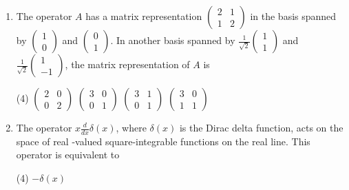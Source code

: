 \begin{enumerate}
 \begin{tasks}(2)
	\task[\textbf{a.}]Saturates to a finite value
	\task[\textbf{b.}]Increases with time as $\sqrt{t}$
	\task[\textbf{c.}]Increases linearly with time
	\task[\textbf{d.}]Increases exponentially with time
\end{tasks}
\item The operator $A$ has a matrix representation $\left(\begin{array}{ll}2 & 1 \\ 1 & 2\end{array}\right)$ in the basis spanned by $\left(\begin{array}{l}1 \\ 0\end{array}\right)$ and $\left(\begin{array}{l}0 \\ 1\end{array}\right)$. In another basis spanned by $\frac{1}{\sqrt{2}}\left(\begin{array}{l}1 \\ 1\end{array}\right)$ and $\frac{1}{\sqrt{2}}\left(\begin{array}{c}1 \\ -1\end{array}\right)$, the matrix representation of $A$ is
 \begin{tasks}(4)
	\task[\textbf{a.}]$\left(\begin{array}{ll}2 & 0 \\ 0 & 2\end{array}\right)$
	\task[\textbf{b.}]$\left(\begin{array}{ll}3 & 0 \\ 0 & 1\end{array}\right)$
	\task[\textbf{c.}]$\left(\begin{array}{ll}3 & 1 \\ 0 & 1\end{array}\right)$
	\task[\textbf{d.}] $\left(\begin{array}{ll}3 & 0 \\ 1 & 1\end{array}\right)$
\end{tasks}
\item The operator $x \frac{d}{d x} \delta(x)$, where $\delta(x)$ is the Dirac delta function, acts on the space of real -valued square-integrable functions on the real line. This operator is equivalent to
 \begin{tasks}(4)
	\task[\textbf{a.}]$-\delta(x)$

\end{tasks}
\end{enumerate}
